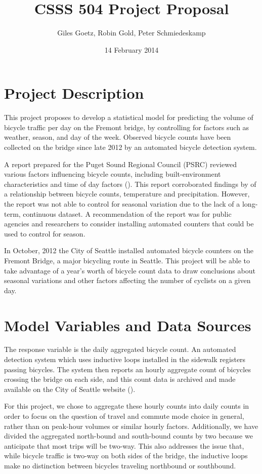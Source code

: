 \documentclass[10pt,letterpaper,article]{memoir} %
\title{CSSS 504 Project Proposal}
\author{Giles Goetz, Robin Gold, Peter Schmiedeskamp}
\date{14 February 2014} %
\begin{document}
\maketitle


\chapter*{Project Description}
This project proposes to develop a statistical model for predicting
the volume of bicycle traffic per day on the Fremont bridge, by
controlling for factors such as weather, season, and day of the week.
Observed bicycle counts have been collected on the bridge since late
2012 by an automated bicycle detection system.

A report prepared for the Puget Sound Regional Council (PSRC) reviewed
various factors influencing bicycle counts, including
built-environment characteristics and time of day
factors (\cite{Bassok:2011aa}). This report corroborated findings by
\textcite{City-of-Vancouver:1999aa,Niemeier:1996aa,Parkin:2008aa} of a
relationship between bicycle counts, temperature and precipitation.
However, the report was not able to control for seasonal variation due
to the lack of a long-term, continuous dataset. A recommendation of
the report was for public agencies and researchers to consider
installing automated counters that could be used to control for
season.

In October, 2012 the City of Seattle installed automated bicycle
counters on the Fremont Bridge, a major bicycling route in Seattle.
This project will be able to take advantage of a year's worth 
of bicycle count data to draw conclusions about seasonal variations and 
other factors affecting the number of cyclists on a given day.

\chapter*{Model Variables and Data Sources}
The response variable is the daily aggregated bicycle count. An
automated detection system which uses inductive loops installed in the
sidewalk registers passing bicycles. The system then reports an hourly
aggregate count of bicycles crossing the bridge on each side, and this
count data is archived and made available on the City of
Seattle website (\cite{City-of-Seattle:aa}).

For this project, we chose to aggregate these hourly counts into daily
counts in order to focus on the question of travel and commute mode
choice in general, rather than on peak-hour volumes or similar hourly
factors. Additionally, we have divided the aggregated north-bound and
south-bound counts by two because we anticipate that most trips will
be two-way. This also addresses the issue that, while bicycle traffic
is two-way on both sides of the bridge, the inductive loops make no
distinction between bicycles traveling northbound or southbound.
\end{document}

